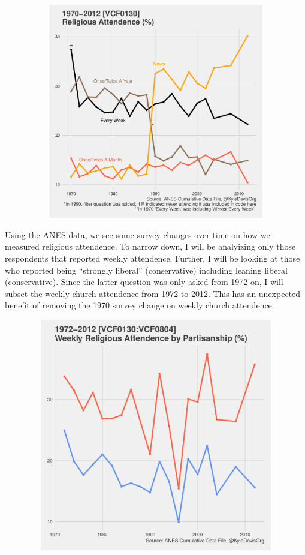 \documentclass[12pt]{article}\usepackage[]{graphicx}\usepackage[]{color}
\newenvironment{knitrout}{}{} %
\begin{document}
\begin{flushleft}
\begin{center}
\begin{knitrout}
\color{fgcolor}
\includegraphics[width=6in,height=3.7in]{figure/desc-1} 

\end{knitrout}
\end{center}

Using the ANES data, we see some survey changes over time on how we measured religious attendence. To narrow down, I will be analyizing only those respondents that reported weekly attendence. Further, I will be looking at those who reported being ``strongly liberal'' (conservative) including leaning liberal (conservative). Since the latter question was only asked from 1972 on, I will subset the weekly church attendence from 1972 to 2012. This has an unexpected benefit of removing the 1970 survey change on weekly church attendence.

\begin{center}
\begin{knitrout}
\color{fgcolor}
\includegraphics[width=6in,height=4in]{figure/descriptiveplot-1} 


\end{knitrout}
\end{center}
\end{flushleft}
\end{document}

